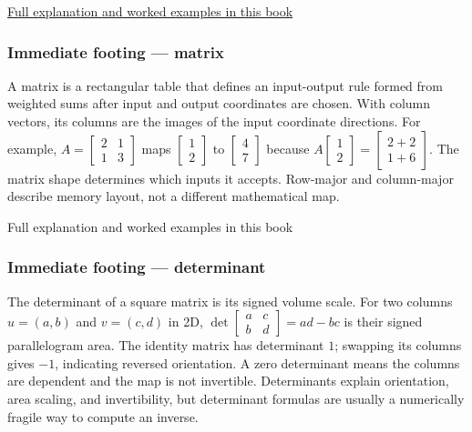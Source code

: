 \hyperref[01-foundations-i-ch017-numbers-become-a-system-of-permitted-operations]{Full explanation and worked examples in this book}

\subsubsection{Immediate footing --- matrix}\label{01-foundations-i-ch018-immediate-footing-matrix}

A matrix is a rectangular table that defines an input-output rule formed from weighted sums after input and output coordinates are chosen. With column vectors, its columns are the images of the input coordinate directions. For example, \(A=\begin{bmatrix}2&1\\1&3\end{bmatrix}\) maps \(\begin{bmatrix}1\\2\end{bmatrix}\) to \(\begin{bmatrix}4\\7\end{bmatrix}\) because \(A\begin{bmatrix}1\\2\end{bmatrix}=\begin{bmatrix}2+2\\1+6\end{bmatrix}\). The matrix shape determines which inputs it accepts. Row-major and column-major describe memory layout, not a different mathematical map.

{Full explanation and worked examples in this book}

\subsubsection{Immediate footing --- determinant}\label{01-foundations-i-ch018-immediate-footing-determinant}

The determinant of a square matrix is its signed volume scale. For two columns \(u=(a,b)\) and \(v=(c,d)\) in 2D, \(\det\begin{bmatrix}a&c\\b&d\end{bmatrix}=ad-bc\) is their signed parallelogram area. The identity matrix has determinant \(1\); swapping its columns gives \(-1\), indicating reversed orientation. A zero determinant means the columns are dependent and the map is not invertible. Determinants explain orientation, area scaling, and invertibility, but determinant formulas are usually a numerically fragile way to compute an inverse.


